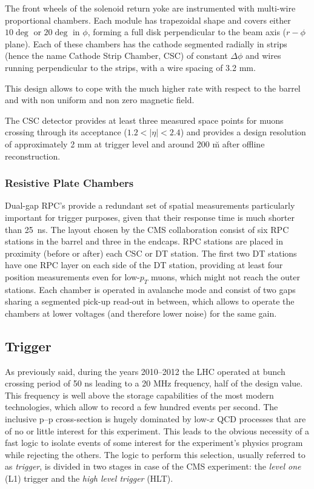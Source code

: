 The front wheels of the solenoid return yoke are instrumented with multi-wire proportional chambers. Each module has trapezoidal shape and covers either $10\deg$ or $20\deg$ in $\phi$, forming a full disk perpendicular to the beam axis ($r-\phi$ plane). Each of these chambers has the cathode segmented radially in strips (hence the name Cathode Strip Chamber, CSC) of constant $\Delta\phi$ and wires running perpendicular to the strips,  with a wire spacing of 3.2 mm. 

This design allows to cope with the much higher rate with respect to the barrel and with non uniform and non zero magnetic field. 

The CSC detector provides at least three measured space points for muons crossing through its acceptance ($1.2 < |\eta| < 2.4$) and provides a design resolution of approximately 2 mm at trigger level and around 200 \u m after offline reconstruction.

\subsubsection*{Resistive Plate Chambers}

Dual-gap RPC's provide a redundant set of spatial measurements particularly important for trigger purposes, given that their response time is much shorter than 25~ns. The layout chosen by the CMS collaboration consist of six RPC stations in the barrel and three in the endcaps. RPC stations are placed in proximity (before or after) each CSC or DT station. The first two DT stations have one RPC layer on each side of the DT station, providing at least four position measurements even for low-$p_T$ muons, which might not reach the outer stations. Each chamber is operated in avalanche mode and consist of two gaps sharing a segmented pick-up read-out in between, which allows to operate the chambers at lower voltages (and therefore lower noise) for the same gain. 

\subsection{Trigger}

As previously said, during the years 2010--2012 the LHC operated at bunch crossing period of %
50 ns leading to a 20 MHz frequency, half of the design value.
This frequency is well above the storage capabilities of the most modern technologies, which allow to record a few hundred events per second. The inclusive p--p cross-section is hugely dominated by low-$x$ QCD processes that are of no or little interest for this experiment. 
This leads to the obvious necessity of a fast logic to isolate events of some interest for the experiment's physics program while rejecting the others. 
The logic to perform this selection, usually referred to as \emph{trigger}, is divided in two stages in case of the CMS experiment: the \emph{level one} (L1) trigger and the \emph{high level trigger} (HLT). 

